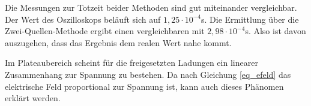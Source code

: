 Die Messungen zur Totzeit beider Methoden sind gut miteinander vergleichbar. Der Wert des Oszilloskops beläuft sich auf
$1,25 \cdot 10^{-4}$s. Die Ermittlung über die Zwei-Quellen-Methode ergibt einen vergleichbaren mit $2,98 \cdot 10^{-4}$s. Also ist
davon auszugehen, dass das Ergebnis dem realen Wert nahe kommt.

Im Plateaubereich scheint für die freigesetzten Ladungen ein linearer Zusammenhang zur Spannung zu bestehen. Da nach Gleichung \eqref{eq_efeld}
das elektrische Feld proportional zur Spannung ist, kann auch dieses Phänomen erklärt werden.




